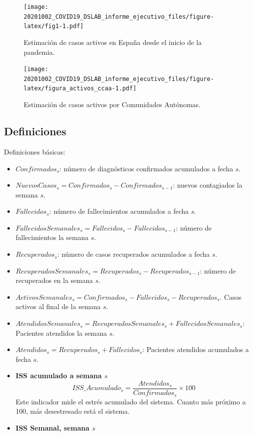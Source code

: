 \documentclass[
  11pt,
]{article}
\begin{document}
\vspace{0.2cm}

\begin{figure}
\centering
\texttt{[image: 20201002\_COVID19\_DSLAB\_informe\_ejecutivo\_files/figure-latex/fig1-1.pdf]}
\caption{\label{fig:fig17a_res} Estimación de casos activos en España
desde el inicio de la pandemia.}
\end{figure}

\begin{figure}
\centering
\texttt{[image: 20201002\_COVID19\_DSLAB\_informe\_ejecutivo\_files/figure-latex/figura\_activos\_ccaa-1.pdf]}
\caption{\label{fig:figura_activos_ccaa} Estimación de casos activos por
Comunidades Autónomas.}
\end{figure}

\clearpage

\hypertarget{definiciones}{%
\subsection{Definiciones}\label{definiciones}}

Definiciones básicas:

\begin{itemize}
\item
  \(Confirmados_s\): número de diagnósticos confirmados acumulados a
  fecha \(s\).
\item
  \(NuevosCasos_{s} = Confirmados_{s} - Confirmados_{s-1}\): nuevos
  contagiados la semana \(s\).
\item
  \(Fallecidos_s\): número de fallecimientos acumulados a fecha \(s\).
\item
  \(FallecidosSemanales_s = Fallecidos_{s} - Fallecidos_{s-1}\): número
  de fallecimientos la semana \(s\).
\item
  \(Recuperados_s\): número de casos recuperados acumulados a fecha
  \(s\).
\item
  \(RecuperadosSemanales_{s} = Recuperados_{s} - Recuperados_{s-1}\):
  número de recuperados en la semana \(s\).
\item
  \(ActivosSemanales_s = Confirmados_s - Fallecidos_s - Recuperados_s\).
  Casos activos al final de la semana \(s\).
\item
  \(AtendidosSemanales_{s} = RecuperadosSemanales_s + FallecidosSemanales_s\):
  Pacientes atendidos la semana \(s\).
\item
  \(Atendidos_{s} = Recuperados_s + Fallecidos_s\): Pacientes atendidos
  acumulados a fecha \(s\).
\item
  \textbf{ISS acumulado a semana \(s\)}
  \[ISS\_Acumulado_s = \frac{Atendidos_s}{Confirmados_s} \times 100\]
  Este indicador mide el estrés acumulado del sistema. Cuanto más
  próximo a 100, más desestresado está el sistema.
\item
  \textbf{ISS Semanal, semana \(s\)}
\end{itemize}
\end{document}
